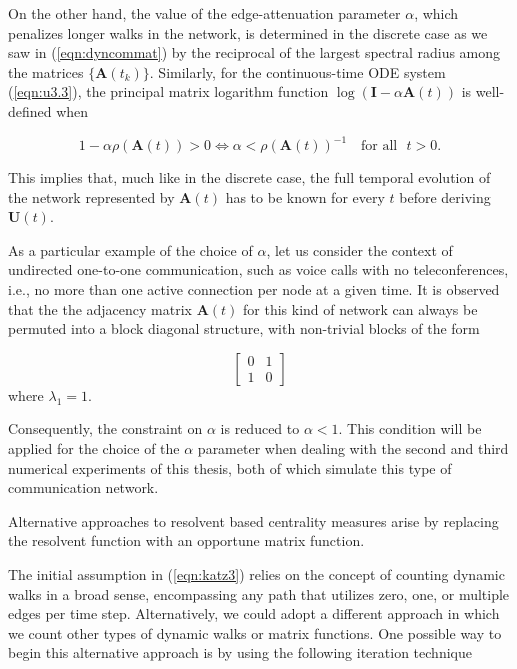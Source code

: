On the other hand, the value of the edge-attenuation parameter $\alpha$, which penalizes longer walks in the network, is determined in the discrete case as we saw in (\ref{eqn:dyncommat}) by the reciprocal of the largest spectral radius among the matrices $\{\mathbf{A}(t_k)\}$. Similarly, for the continuous-time ODE system (\ref{eqn:u3.3}), the principal matrix logarithm function $\log (\mathbf{I} - \alpha \mathbf{A}(t))$ is well-defined when \cite[Ch.\ 11]{higham2008functions} 

$$1 - \alpha\rho(\mathbf{A}(t)) > 0 \iff \alpha < \rho(\mathbf{A}(t))^{-1} \text{~~~for all~~} t>0.$$

This implies that, much like in the discrete case, the full temporal evolution of the network represented by $\mathbf{A}(t)$ has to be known for every $t$ before deriving $\mathbf{U}(t)$.

As a particular example of the choice of $\alpha$, let us consider the context of undirected one-to-one communication, such as voice calls with no teleconferences, i.e., no more than one active connection per node at a given time. It is observed that the the adjacency matrix $\mathbf{A}(t)$ for this kind of network can always be permuted into a block diagonal structure, with non-trivial blocks of the form

$$\begin{bmatrix}
0 & 1\\
1 & 0 
\end{bmatrix}$$ where $\lambda_1=1$.

Consequently, the constraint on $\alpha$ is reduced to $\alpha<1$. This condition will be applied for the choice of the $\alpha$ parameter when dealing with the second and third numerical experiments of this thesis, both of which simulate this type of communication network.

\begin{highlightedParagraphC}

Alternative approaches to resolvent based centrality measures arise by replacing the resolvent function with an opportune matrix function.
 

\end{highlightedParagraphC}

The initial assumption in (\ref{eqn:katz3}) relies on the concept of counting dynamic walks in a broad sense, encompassing any path that utilizes zero, one, or multiple edges per time step. Alternatively, we could adopt a different approach in which we count other types of dynamic walks or matrix functions. One possible way to begin this alternative approach is by using the following iteration technique

